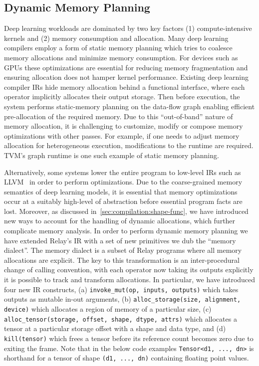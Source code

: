 \subsection{Dynamic Memory Planning}
\label{subsec:optimizations:memory}

Deep learning workloads are dominated by two key factors
  (1) compute-intensive kernels and (2) memory consumption and allocation.
Many deep learning compilers employ a form of static memory planning which
  tries to coalesce memory allocations and minimize memory consumption.
For devices such as GPUs these optimizations are essential for reducing
  memory fragmentation and ensuring allocation does not hamper kernel performance.
Existing deep learning compiler IRs hide memory allocation behind a functional interface,
  where each operator implicitly allocates their output storage.
Then before execution, the system performs static-memory planning on the
  data-flow graph enabling efficient pre-allocation of the required memory.
Due to this ``out-of-band'' nature of memory allocation,
  it is challenging to customize, modify or compose memory optimizations with other passes.
For example, if one needs to adjust memory allocation for heterogeneous execution,
  modifications to the runtime are required.
TVM's graph runtime is one such example of static memory planning.

Alternatively, some systems lower the entire program to low-level IRs such as
  LLVM~\citep{llvm} in order to perform optimizations.
Due to the coarse-grained memory semantics of deep learning models,
  it is essential that memory optimizations occur at a suitably
  high-level of abstraction before essential program facts are lost.
Moreover, as discussed in~\autoref{sec:compilation:shape-func},
  we have introduced new ways to account for the handling of dynamic allocations,
  which further complicate memory analysis.
In order to perform dynamic memory planning we have extended Relay's IR with
  a set of new primitives we dub the ``memory dialect''.
The memory dialect is a subset of Relay programs where all memory allocations are
  explicit.
The key to this transformation is an inter-procedural change of calling convention,
  with each operator now taking its outputs explicitly it is possible to
  track and transform allocations.
In particular, we have introduced four new IR constructs,
  (a) \verb|invoke_mut(op, inputs, outputs)| which takes outputs as mutable in-out arguments,
  (b) \texttt{alloc\_storage(size, alignment, device)} which allocates a region of memory
      of a particular size,
  (c) \texttt{alloc\_tensor(storage, offset, shape, dtype, attrs)} which allocates
    a tensor at a particular storage offset
    with a shape and data type, and
  (d) \verb|kill(tensor)| which frees a tensor before its reference count
    becomes zero due to exiting the frame.
Note that in the below code examples \texttt{Tensor<d1, ..., dn>}
is shorthand for a tensor of shape \texttt{(d1, ..., dn)} containing floating point values.

